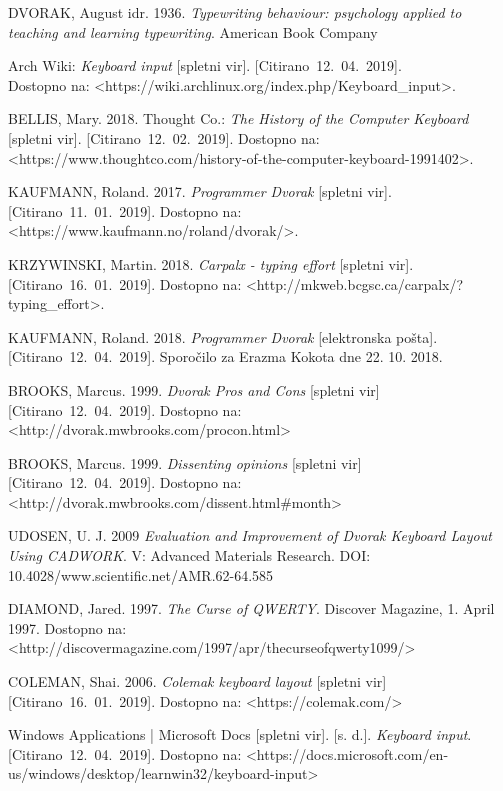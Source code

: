 

\begin{thebibliography}{9}

  DVORAK, August idr. 1936. \textit{Typewriting behaviour: psychology applied to teaching and learning typewriting}.
  American Book Company

  Arch Wiki: \textit{Keyboard input} [spletni vir].
  \mbox{[Citirano 12. 04. 2019]}. \\
  Dostopno na: <https://wiki.archlinux.org/index.php/Keyboard\_input>.

  BELLIS, Mary. 2018. Thought Co.: \textit{The History of the Computer Keyboard} [spletni vir].
  \mbox{[Citirano 12. 02. 2019]}.
  Dostopno na: <https://www.thoughtco.com/history-of-the-computer-keyboard-1991402>.

  KAUFMANN, Roland. 2017. \textit{Programmer Dvorak} [spletni vir].
  \mbox{[Citirano 11. 01. 2019]}.
  Dostopno na: <https://www.kaufmann.no/roland/dvorak/>.

  KRZYWINSKI, Martin. 2018. \textit{Carpalx - typing effort} [spletni vir].
  \mbox{[Citirano 16. 01. 2019]}.
  Dostopno na: <http://mkweb.bcgsc.ca/carpalx/?typing\_effort>.

  KAUFMANN, Roland. 2018. \textit{Programmer Dvorak} [elektronska pošta].
  \mbox{[Citirano 12. 04. 2019]}.
  Sporočilo za Erazma Kokota dne 22. 10. 2018.

  BROOKS, Marcus. 1999. \textit{Dvorak Pros and Cons} [spletni vir]
  \mbox{[Citirano 12. 04. 2019]}.
  Dostopno na: <http://dvorak.mwbrooks.com/procon.html>

  BROOKS, Marcus. 1999. \textit{Dissenting opinions} [spletni vir]
  \mbox{[Citirano 12. 04. 2019]}.
  Dostopno na: <http://dvorak.mwbrooks.com/dissent.html\#month>

  UDOSEN, U. J\@. 2009 \textit{Evaluation and Improvement of Dvorak Keyboard Layout Using CADWORK}.
  V: Advanced Materials Research.
  DOI: 10.4028/www.scientific.net/AMR.62-64.585

  DIAMOND, Jared. 1997. \textit{The Curse of QWERTY}.
  Discover Magazine, 1. April 1997.
  Dostopno na: <http://discovermagazine.com/1997/apr/thecurseofqwerty1099/>

  COLEMAN, Shai. 2006. \textit{Colemak keyboard layout} [spletni vir]
  \mbox{[Citirano 16. 01. 2019]}.
  Dostopno na: <https://colemak.com/>

  Windows Applications | Microsoft Docs [spletni vir]. [s. d.]. \textit{Keyboard input}.
  \mbox{[Citirano 12. 04. 2019]}.
  Dostopno na: <https://docs.microsoft.com/en-us/windows/desktop/learnwin32/keyboard-input>

\end{thebibliography}

